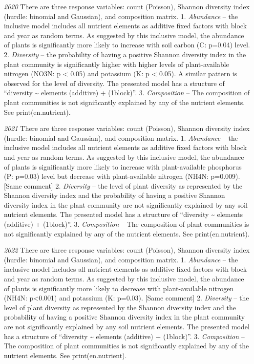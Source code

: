 \documentclass[
]{article}
\begin{document}
\emph{2020} There are three response variables: count (Poisson), Shannon
diversity index (hurdle: binomial and Gaussian), and composition matrix.
1. \emph{Abundance} -- the inclusive model includes all nutrient
elements as additive fixed factors with block and year as random terms.
As suggested by this inclusive model, the abundance of plants is
significantly more likely to increase with soil carbon (C: p=0.04)
level. 2. \emph{Diversity} -- the probability of having a positive
Shannon diversity index in the plant community is significantly higher
with higher levels of plant-available nitrogen (NO3N: p \textless{}
0.05) and potassium (K: p \textless{} 0.05). A similar pattern is
observed for the level of diversity. The presented model has a structure
of ``diversity \textasciitilde{} elements (additive) +
(1\textbar block)''. 3. \emph{Composition} -- The composition of plant
communities is not significantly explained by any of the nutrient
elements. See print(en.nutrient).

\emph{2021} There are three response variables: count (Poisson), Shannon
diversity index (hurdle: binomial and Gaussian), and composition matrix.
1. \emph{Abundance} -- the inclusive model includes all nutrient
elements as additive fixed factors with block and year as random terms.
As suggested by this inclusive model, the abundance of plants is
significantly more likely to increase with plant-available phosphorus
(P: p=0.03) level but decrease with plant-available nitrogen (NH4N:
p=0.009). {[}Same comment{]} 2. \emph{Diversity} -- the level of plant
diversity as represented by the Shannon diversity index and the
probability of having a positive Shannon diversity index in the plant
community are not significantly explained by any soil nutrient elements.
The presented model has a structure of ``diversity \textasciitilde{}
elements (additive) + (1\textbar block)''. 3. \emph{Composition} -- The
composition of plant communities is not significantly explained by any
of the nutrient elements. See print(en.nutrient).

\emph{2022} There are three response variables: count (Poisson), Shannon
diversity index (hurdle: binomial and Gaussian), and composition matrix.
1. \emph{Abundance} -- the inclusive model includes all nutrient
elements as additive fixed factors with block and year as random terms.
As suggested by this inclusive model, the abundance of plants is
significantly more likely to decrease with plant-available nitrogen
(NH4N: p\textless0.001) and potassium (K: p=0.03). {[}Same comment{]} 2.
\emph{Diversity} -- the level of plant diversity as represented by the
Shannon diversity index and the probability of having a positive Shannon
diversity index in the plant community are not significantly explained
by any soil nutrient elements. The presented model has a structure of
``diversity \textasciitilde{} elements (additive) + (1\textbar block)''.
3. \emph{Composition} -- The composition of plant communities is not
significantly explained by any of the nutrient elements. See
print(en.nutrient).
\end{document}
